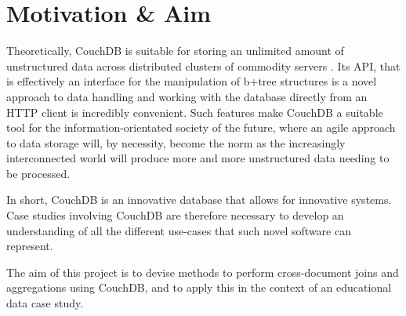 \section{Motivation \& Aim}
Theoretically, CouchDB is suitable for storing an unlimited amount of unstructured data across distributed clusters of commodity servers \cite{couchdb2.0}. Its API, that is effectively an interface for the manipulation of b+tree structures is a novel approach to data handling and working with the database directly from an HTTP client is incredibly convenient. Such features make CouchDB a suitable tool for the information-orientated society of the future, where an agile approach to data storage will, by necessity, become the norm as the increasingly interconnected world will produce more and more unstructured data needing to be processed.

In short, CouchDB is an innovative database that allows for innovative systems. Case studies involving CouchDB are therefore necessary to develop an understanding of all the different use-cases that such novel software can represent.

The aim of this project is to devise methods to perform cross-document joins and aggregations using CouchDB, and to apply this in the context of an educational data case study.